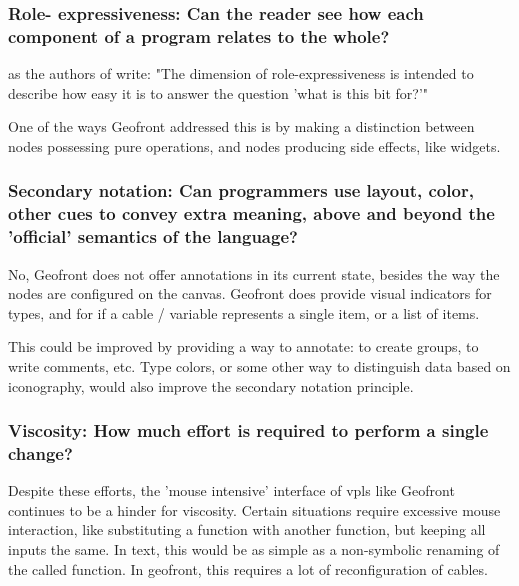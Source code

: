 
\subsubsection*{Role- expressiveness: Can the reader see how each component of a program relates to the whole?}

as the authors of \cite[]{green_usability_1996} write: "The dimension of role-expressiveness is intended to describe how easy it is to answer the question 'what is this bit for?'"

One of the ways Geofront addressed this is by making a distinction between nodes possessing pure operations, and nodes producing side effects, like widgets. 




\subsubsection*{Secondary notation: Can programmers use layout, color, other cues to convey extra meaning, above and beyond the 'official' semantics of the language?}

No, Geofront does not offer annotations in its current state, besides the way the nodes are configured on the canvas.  
Geofront does provide visual indicators for types, and for if a cable / variable represents a single item, or a list of items.

This could be improved by providing a way to annotate: to create groups, to write comments, etc. 
Type colors, or some other way to distinguish data based on iconography, would also improve the secondary notation principle.

\subsubsection*{Viscosity: How much effort is required to perform a single change?}

Despite these efforts, the 'mouse intensive' interface of vpls like Geofront continues to be a hinder for viscosity.
Certain situations require excessive mouse interaction, like substituting a function with another function, but keeping all inputs the same.
In text, this would be as simple as a non-symbolic renaming of the called function.
In geofront, this requires a lot of reconfiguration of cables. 

